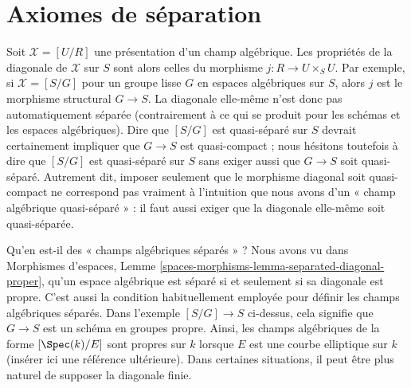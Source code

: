 \section{Axiomes de séparation}
\label{section-separated}

\noindent
Soit $\mathcal{X}=[U/R]$ une présentation d'un champ algébrique. Les
propriétés de la diagonale de $\mathcal{X}$ sur $S$ sont alors celles du
morphisme $j:R\to U\times_SU$. Par exemple, si
$\mathcal{X}=[S/G]$ pour un groupe lisse $G$ en espaces algébriques sur $S$,
alors $j$ est le morphisme structural $G\to S$. La diagonale elle-même n'est
donc pas automatiquement séparée (contrairement à ce qui se produit pour les
schémas et les espaces algébriques). Dire que $[S/G]$ est quasi-séparé sur
$S$ devrait certainement impliquer que $G\to S$ est quasi-compact ; nous
hésitons toutefois à dire que $[S/G]$ est quasi-séparé sur $S$ sans exiger aussi que
$G\to S$ soit quasi-séparé. Autrement dit, imposer seulement que le morphisme
diagonal soit quasi-compact ne correspond pas vraiment à l'intuition que nous
avons d'un « champ algébrique quasi-séparé » : il faut aussi exiger que la
diagonale elle-même soit quasi-séparée.

\medskip\noindent
Qu'en est-il des « champs algébriques séparés » ? Nous avons vu dans
Morphismes d'espaces,
Lemme \ref{spaces-morphisms-lemma-separated-diagonal-proper}, qu'un espace
algébrique est séparé si et seulement si sa diagonale est propre. C'est aussi
la condition habituellement employée pour définir les champs algébriques
séparés. Dans l'exemple $[S/G]\to S$ ci-dessus, cela signifie que $G\to S$
est un schéma en groupes propre. Ainsi, les champs algébriques de la forme
$[\Spec(k)/E]$ sont propres sur $k$ lorsque $E$ est une courbe elliptique sur
$k$ (insérer ici une référence ultérieure). Dans certaines situations, il peut
être plus naturel de supposer la diagonale finie.

